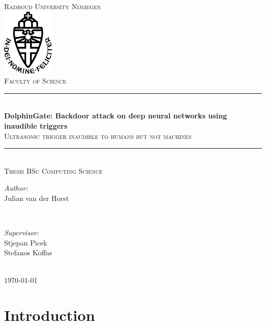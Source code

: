 \documentclass{report}
\title{\thesistitle}
\author{\thesisauthorfirst\space\thesisauthorsecond}
\date{\thesisdate}
\def\thesistitle{DolphinGate: Backdoor attack on deep neural networks using inaudible triggers}
\def\thesissubtitle{Ultrasonic trigger inaudible to humans but not machines}
\def\thesisauthorfirst{Julian van der Horst}
\def\thesisauthorsecond{}
\def\thesissupervisorfirst{Stjepan Picek\\Stefanos Koffas}
\def\thesissupervisorsecond{}
\def\thesissecondreaderfirst{}
\def\thesissecondreadersecond{}
\def\thesisdate{May 2023}
\theoremstyle{definition}
\theoremstyle{remark}
\begin{document}
\begin{titlepage}
	\thispagestyle{empty}
	\newcommand{\HRule}{\rule{\linewidth}{0.5mm}}
	\center
	\textsc{\Large Radboud University Nijmegen}\\[.7cm]
	\includegraphics[width=25mm]{img/in_dei_nomine_feliciter.eps}\\[.5cm]
	\textsc{Faculty of Science}\\[0.5cm]
	
	\HRule \\[0.4cm]
	{ \huge \bfseries \thesistitle}\\[0.1cm]
	\textsc{\thesissubtitle}\\
	\HRule \\[.5cm]
	\textsc{\large Thesis BSc Computing Science}\\[.5cm]
	
	\begin{minipage}{0.4\textwidth}
	\begin{flushleft} \large
	\emph{Author:}\\
	\thesisauthorfirst\space \textsc{\thesisauthorsecond}
	\end{flushleft}
	\end{minipage}
	~
	\begin{minipage}{0.4\textwidth}
	\begin{flushright} \large
	\emph{Supervisor:} \\
	\thesissupervisorfirst\space \textsc{\thesissupervisorsecond} \\[1em]
	\end{flushright}
	\end{minipage}\\[4cm]
	\vfill
	{\large \today}\\
	\clearpage
\end{titlepage}

\tableofcontents

\chapter{Introduction}
\end{document}
